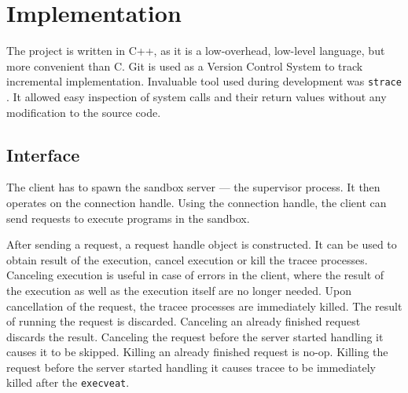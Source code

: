 \documentclass[en]{pracamgr}
\begin{document}
\chapter{Implementation}\label{chapter:implementation}

The project is written in C++, as it is a low-overhead, low-level language, but more convenient than C. Git is used as a Version Control System to track incremental implementation. Invaluable tool used during development was \texttt{strace} \cite{strace}. It allowed easy inspection of system calls and their return values without any modification to the source code.

\section{Interface}

The client has to spawn the sandbox server --- the supervisor process. It then operates on the connection handle. Using the connection handle, the client can send requests to execute programs in the sandbox.

After sending a request, a request handle object is constructed. It can be used to obtain result of the execution, cancel execution or kill the tracee processes. Canceling execution is useful in case of errors in the client, where the result of the execution as well as the execution itself are no longer needed. Upon cancellation of the request, the tracee processes are immediately killed. The result of running the request is discarded. Canceling an already finished request discards the result. Canceling the request before the server started handling it causes it to be skipped. Killing an already finished request is no-op. Killing the request before the server started handling it causes tracee to be immediately killed after the \texttt{execveat}.
\end{document}
